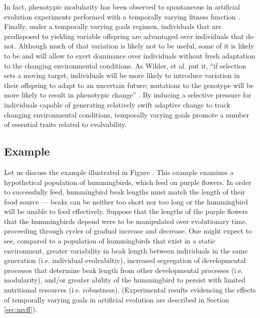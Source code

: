 In fact, phenotypic modularity has been observed to spontaneous in artificial evolution experiments performed with a temporally varying fitness function \cite{Kashtan2007VaryingEvolution}. Finally, under a temporally varying goals regimen, individuals that are predisposed to yielding variable offspring are advantaged over individuals that do not.\mindmapmark{\individualevolvabilitytemporallyvaryinggoals} Although much of that variation is likely not to be useful, some of it is likely to be and will allow to exert dominance over individuals without fresh adaptation to the changing environmental conditions. As Wilder, et al. put it, ``if selection sets a moving target, individuals will be more likely to introduce variation in their offspring to adapt to an uncertain future; mutations to the genotype will be more likely to result in phenotypic change'' \cite{Wilder2015ReconcilingEvolvability}. By inducing a selective pressure for individuals capable of generating relatively swift adaptive change to track changing environmental conditions, temporally varying goals promote a number of essential traits related to evolvability.

\subsection{Example}

Let us discuss the example illustrated in Figure   . This example examines a hypothetical population  of hummingbirds, which feed on purple flowers. In order to successfully feed, hummingbird beak lengths must match the length of their food source --- beaks can be neither too short nor too long or the hummingbird will be unable to feed effectively. Suppose that the lengths of the purple flowers that the hummingbirds depend were to be manipulated over evolutionary time, proceeding through cycles of gradual increase and decrease. One might expect to see, compared to a population of hummingbirds that exist in a static environment, greater variability in beak length between individuals in the same generation (i.e. individual evolvabiltiy), increased segregation of developmental processes that determine beak length from other developmental processes (i.e. modularity), and/or greater ability of the hummingbird to persist with limited nutritional resources (i.e. robustness). (Experimental results evidencing the effects of temporally varying goals in artificial evolution are described in Section \ref{sec:mvff}).


